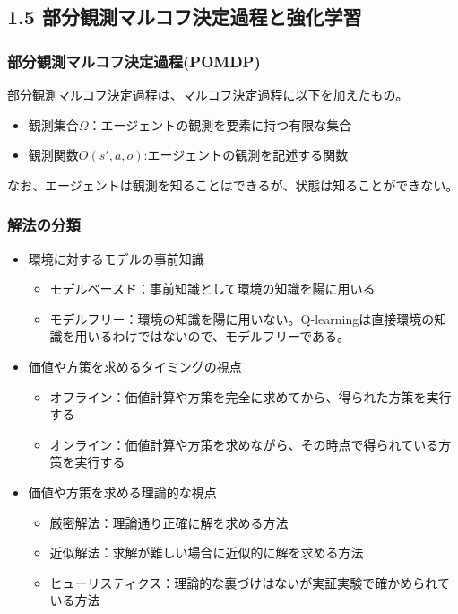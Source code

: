 \documentclass[]{jarticle}
\begin{document}
\subsection*{1.5 部分観測マルコフ決定過程と強化学習}

\subsubsection*{部分観測マルコフ決定過程(POMDP)}

部分観測マルコフ決定過程は、マルコフ決定過程に以下を加えたもの。
\begin{itemize}
	\item 観測集合$\Omega$：エージェントの観測を要素に持つ有限な集合
	\item 観測関数$O(s',a,o)$:エージェントの観測を記述する関数
\end{itemize}
なお、エージェントは観測を知ることはできるが、状態は知ることができない。 

\subsubsection*{解法の分類}

\begin{itemize}
	\item 環境に対するモデルの事前知識
	\begin{itemize}
		\item モデルベースド：事前知識として環境の知識を陽に用いる
		\item モデルフリー：環境の知識を陽に用いない。Q-learningは直接環境の知識を用いるわけではないので、モデルフリーである。
	\end{itemize}
	
	\item 価値や方策を求めるタイミングの視点
	\begin{itemize}
		\item オフライン：価値計算や方策を完全に求めてから、得られた方策を実行する
		\item オンライン：価値計算や方策を求めながら、その時点で得られている方策を実行する
	\end{itemize}

	\item 価値や方策を求める理論的な視点
	\begin{itemize}
		\item 厳密解法：理論通り正確に解を求める方法
		\item 近似解法：求解が難しい場合に近似的に解を求める方法
		\item ヒューリスティクス：理論的な裏づけはないが実証実験で確かめられている方法
	\end{itemize}

\end{itemize}
\end{document}
